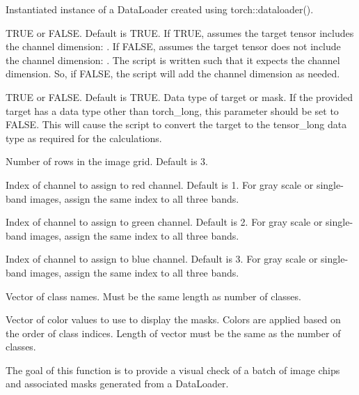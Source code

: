 \documentclass[a4paper]{book}
\begin{document}
%
\begin{Arguments}
\begin{ldescription}
\item[\code{dataLoader}] Instantiated instance of a DataLoader created using torch::dataloader().

\item[\code{chnDim}] TRUE or FALSE. Default is TRUE. If TRUE, assumes the target tensor includes the
channel dimension: . If FALSE, assumes the target tensor does not include the
channel dimension: . The script is written such that it expects the channel dimension.
So, if FALSE, the script will add the channel dimension as needed.

\item[\code{mskLong}] TRUE or FALSE. Default is TRUE. Data type of target or mask. If the provided target
has a data type other than torch\_long, this parameter should be set to FALSE. This will cause the
script to convert the target to the tensor\_long data type as required for the calculations.

\item[\code{nRows}] Number of rows in the image grid. Default is 3.

\item[\code{r}] Index of channel to assign to red channel. Default is 1.
For gray scale or single-band images, assign the same index to all three bands.

\item[\code{g}] Index of channel to assign to green channel. Default is 2.
For gray scale or single-band images, assign the same index to all three bands.

\item[\code{b}] Index of channel to assign to blue channel. Default is 3.
For gray scale or single-band images, assign the same index to all three bands.

\item[\code{cNames}] Vector of class names. Must be the same length as number of classes.

\item[\code{cColors}] Vector of color values to use to display the masks. Colors are applied based on the
order of class indices. Length of vector must be the same as the number of classes.
\end{ldescription}
\end{Arguments}
%
\begin{Details}\relax
The goal of this function is to provide a visual check of a batch of image chips and associated masks
generated from a DataLoader.
\end{Details}
\end{document}
